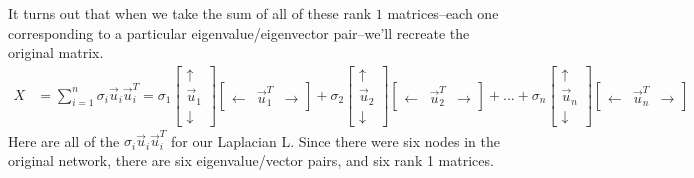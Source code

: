 \documentclass[letterpaper,10pt,english]{jupyterBook}
\begin{document}
\sphinxAtStartPar
It turns out that when we take the sum of all of these rank \(1\) matrices–each one corresponding to a particular eigenvalue/eigenvector pair–we’ll recreate the original matrix.
\begin{align*}
    X &= \sum_{i = 1}^n \sigma_i \vec u_i \vec u_i^T = \sigma_1 \begin{bmatrix}\uparrow \\ \vec u_1 \\ \downarrow\end{bmatrix}\begin{bmatrix}\leftarrow & \vec u_1^T & \rightarrow \end{bmatrix} + 
    \sigma_2 \begin{bmatrix}\uparrow \\ \vec u_2 \\ \downarrow\end{bmatrix}\begin{bmatrix}\leftarrow & \vec u_2^T & \rightarrow \end{bmatrix} + 
    ... + 
    \sigma_n \begin{bmatrix}\uparrow \\ \vec u_n \\ \downarrow\end{bmatrix}\begin{bmatrix}\leftarrow & \vec u_n^T & \rightarrow \end{bmatrix}
\end{align*}
\sphinxAtStartPar
Here are all of the \(\sigma_i \vec u_i \vec u_i^T\) for our Laplacian L. Since there were six nodes in the original network, there are six eigenvalue/vector pairs, and six rank 1 matrices.
\end{document}
